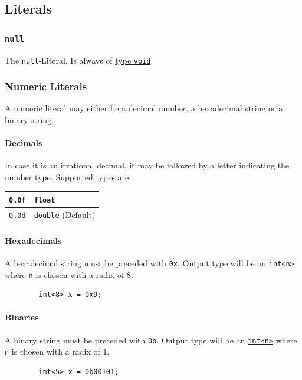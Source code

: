 \documentclass{docs}
\begin{document}
    \subsection{Literals}
    
    \label{litNull}
    \subsubsection{\texttt{null}}
    The \texttt{null}-Literal. Is always of \hyperref[typeVoid]{type \texttt{void}}.
    
    \label{litNum}
    \subsubsection{Numeric Literals}
    A numeric literal may either be a decimal number, a hexadecimal string or a binary string. \\
    \paragraph*{Decimals}
    In case it is an irrational decimal, it may be followed by a letter indicating the number type. Supported types are:
    \begin{center}
    \begin{tabular}{c|l}
        \texttt{0.0f} & \texttt{float} \\
        \hline
        \texttt{0.0d} & \texttt{double} (Default)
    \end{tabular}
    \end{center}
    \paragraph*{Hexadecimals}
    A hexadecimal string must be preceded with \texttt{0x}. Output type will be an \hyperref[typeInt]{\texttt{int<n>}} where \texttt{n} is chosen with a radix of 8.
    \begin{verbatim}
        int<8> x = 0x9;
    \end{verbatim}
    \paragraph*{Binaries}
    A binary string must be preceded with \texttt{0b}. Output type will be an \hyperref[typeInt]{\texttt{int<n>}} where \texttt{n} is chosen with a radix of 1.
    \begin{verbatim}
        int<5> x = 0b00101;
    \end{verbatim}
    
\end{document}
